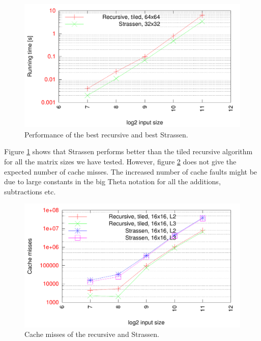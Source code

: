 \begin{figure}[h!]
  \centering
  \includegraphics[width=\textwidth]{"../project2/gnuplots/recursive_vs_strassen_performance"}
  \caption{Performance of the best recursive and best Strassen.}
  \label{fig:recursive_vs_strassen_performance}
\end{figure}

Figure \ref{fig:recursive_vs_strassen_performance} shows that Strassen performs better than the tiled recursive algorithm for all the matrix sizes we have tested. However, figure \ref{fig:recursive_vs_strassen_cache} does not give the expected number of cache misses. The increased number of cache faults might be due to large constants in the big Theta notation for all the additions, subtractions etc.

\begin{figure}[h!]
  \centering
  \includegraphics[width=\textwidth]{"../project2/gnuplots/recursive_vs_strassen_cache"}
  \caption{Cache misses of the recursive and Strassen.}
  \label{fig:recursive_vs_strassen_cache}
\end{figure}

